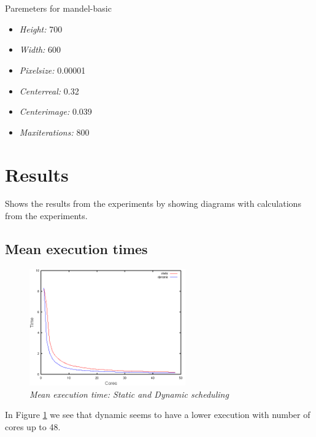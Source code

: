 \documentclass[a4paper,12pt]{article}
\begin{document}
\\\\
Paremeters for mandel-basic
\begin{itemize}
\item \emph{Height:} 700
\item \emph{Width:} 600
\item \emph{Pixelsize:} 0.00001
\item \emph{Centerreal:} 0.32
\item \emph{Centerimage:} 0.039
\item \emph{Maxiterations:} 800
\end{itemize}

\section{Results}
\label{sec:results}
Shows the results from the experiments by showing diagrams with calculations from the experiments. 

\subsection{Mean execution times}
\label{sec:exec}
\begin{figure}[h!]
\centering
\includegraphics[width=0.6\textwidth]{mean-execution-time-both}
\caption{\emph{Mean execution time: Static and Dynamic scheduling}}
\label{fig:mean-execution-time-both}
\end{figure}

In Figure \ref{fig:mean-execution-time-both} we see that dynamic seems to have a lower execution with number of cores up to 48.

\newpage
\end{document}
